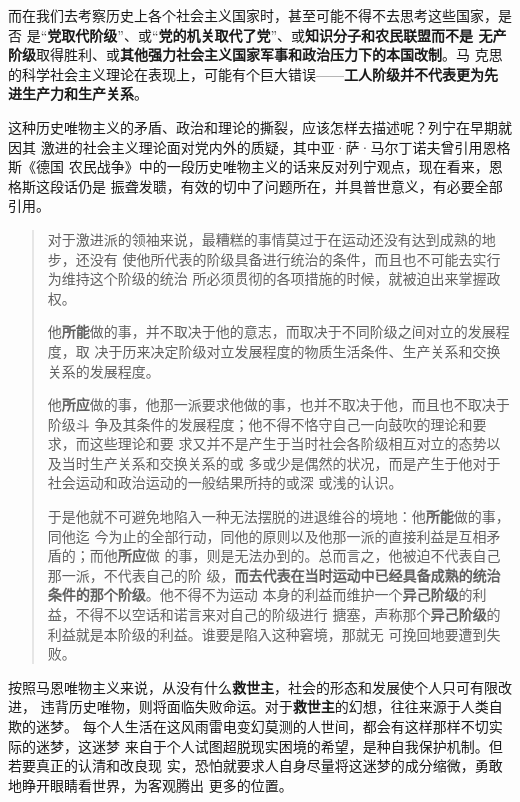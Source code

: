 而在我们去考察历史上各个社会主义国家时，甚至可能不得不去思考这些国家，是否
是“\textbf{党取代阶级}”、或“\textbf{党的机关取代了党}”、或\textbf{知识分子和农民联盟而不是
  无产阶级}取得胜利、或\textbf{其他强力社会主义国家军事和政治压力下的本国改制}。马
克思的科学社会主义理论在表现上，可能有个巨大错误——\textbf{工人阶级并不代表更为先
  进生产力和生产关系}。

这种历史唯物主义的矛盾、政治和理论的撕裂，应该怎样去描述呢？列宁在早期就因其
激进的社会主义理论面对党内外的质疑，其中亚·萨·马尔丁诺夫曾引用恩格斯《德国
农民战争》中的一段历史唯物主义的话来反对列宁观点，现在看来，恩格斯这段话仍是
振聋发聩，有效的切中了问题所在，并具普世意义，有必要全部引用。

\begin{quotation}
  对于激进派的领袖来说，最糟糕的事情莫过于在运动还没有达到成熟的地步，还没有
  使他所代表的阶级具备进行统治的条件，而且也不可能去实行为维持这个阶级的统治
  所必须贯彻的各项措施的时候，就被迫出来掌握政权。

  他\textbf{所能}做的事，并不取决于他的意志，而取决于不同阶级之间对立的发展程度，取
  决于历来决定阶级对立发展程度的物质生活条件、生产关系和交换关系的发展程度。

  他\textbf{所应}做的事，他那一派要求他做的事，也并不取决于他，而且也不取决于阶级斗
  争及其条件的发展程度；他不得不恪守自己一向鼓吹的理论和要求，而这些理论和要
  求又并不是产生于当时社会各阶级相互对立的态势以及当时生产关系和交换关系的或
  多或少是偶然的状况，而是产生于他对于社会运动和政治运动的一般结果所持的或深
  或浅的认识。

  于是他就不可避免地陷入一种无法摆脱的进退维谷的境地：他\textbf{所能}做的事，同他迄
  今为止的全部行动，同他的原则以及他那一派的直接利益是互相矛盾的；而他\textbf{所应}做
  的事，则是无法办到的。总而言之，他被迫不代表自己那一派，不代表自己的阶
  级，\textbf{而去代表在当时运动中已经具备成熟的统治条件的那个阶级}。他不得不为运动
  本身的利益而维护一个\textbf{异己阶级}的利益，不得不以空话和诺言来对自己的阶级进行
  搪塞，声称那个\textbf{异己阶级}的利益就是本阶级的利益。谁要是陷入这种窘境，那就无
  可挽回地要遭到失败。
\end{quotation}

按照马恩唯物主义来说，从没有什么\textbf{救世主}，社会的形态和发展使个人只可有限改进，
违背历史唯物，则将面临失败命运。对于\textbf{救世主}的幻想，往往来源于人类自欺的迷梦。
每个人生活在这风雨雷电变幻莫测的人世间，都会有这样那样不切实际的迷梦，这迷梦
来自于个人试图超脱现实困境的希望，是种自我保护机制。但若要真正的认清和改良现
实，恐怕就要求人自身尽量将这迷梦的成分缩微，勇敢地睁开眼睛看世界，为客观腾出
更多的位置。



